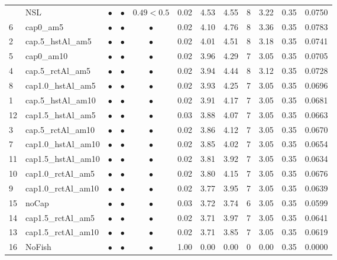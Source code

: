 \documentclass[11pt]{book}
\begin{document}
\begin{landscape}
\begin{longtable}[t]{llcccccccccc}
\midrule
\endhead
\
\endfoot
\bottomrule
\endlastfoot
17 & NSL & $\bullet$ & $\bullet$ & $0.49<0.5$ & 0.02 & 4.53 & 4.55 & 8 & 3.22 & 0.35 & 0.0750\\
6 & cap0\_am5 & $\bullet$ & $\bullet$ & $\bullet$ & 0.02 & 4.10 & 4.76 & 8 & 3.36 & 0.35 & 0.0783\\
2 & cap.5\_hstAl\_am5 & $\bullet$ & $\bullet$ & $\bullet$ & 0.02 & 4.01 & 4.51 & 8 & 3.18 & 0.35 & 0.0741\\
5 & cap0\_am10 & $\bullet$ & $\bullet$ & $\bullet$ & 0.02 & 3.96 & 4.29 & 7 & 3.05 & 0.35 & 0.0705\\
4 & cap.5\_rctAl\_am5 & $\bullet$ & $\bullet$ & $\bullet$ & 0.02 & 3.94 & 4.44 & 8 & 3.12 & 0.35 & 0.0728\\
8 & cap1.0\_hstAl\_am5 & $\bullet$ & $\bullet$ & $\bullet$ & 0.02 & 3.93 & 4.25 & 7 & 3.05 & 0.35 & 0.0696\\
1 & cap.5\_hstAl\_am10 & $\bullet$ & $\bullet$ & $\bullet$ & 0.02 & 3.91 & 4.17 & 7 & 3.05 & 0.35 & 0.0681\\
12 & cap1.5\_hstAl\_am5 & $\bullet$ & $\bullet$ & $\bullet$ & 0.03 & 3.88 & 4.07 & 7 & 3.05 & 0.35 & 0.0663\\
3 & cap.5\_rctAl\_am10 & $\bullet$ & $\bullet$ & $\bullet$ & 0.02 & 3.86 & 4.12 & 7 & 3.05 & 0.35 & 0.0670\\
7 & cap1.0\_hstAl\_am10 & $\bullet$ & $\bullet$ & $\bullet$ & 0.02 & 3.85 & 4.02 & 7 & 3.05 & 0.35 & 0.0654\\
11 & cap1.5\_hstAl\_am10 & $\bullet$ & $\bullet$ & $\bullet$ & 0.02 & 3.81 & 3.92 & 7 & 3.05 & 0.35 & 0.0634\\
10 & cap1.0\_rctAl\_am5 & $\bullet$ & $\bullet$ & $\bullet$ & 0.02 & 3.80 & 4.15 & 7 & 3.05 & 0.35 & 0.0676\\
9 & cap1.0\_rctAl\_am10 & $\bullet$ & $\bullet$ & $\bullet$ & 0.02 & 3.77 & 3.95 & 7 & 3.05 & 0.35 & 0.0639\\
15 & noCap & $\bullet$ & $\bullet$ & $\bullet$ & 0.03 & 3.72 & 3.74 & 6 & 3.05 & 0.35 & 0.0599\\
14 & cap1.5\_rctAl\_am5 & $\bullet$ & $\bullet$ & $\bullet$ & 0.02 & 3.71 & 3.97 & 7 & 3.05 & 0.35 & 0.0641\\
13 & cap1.5\_rctAl\_am10 & $\bullet$ & $\bullet$ & $\bullet$ & 0.02 & 3.71 & 3.85 & 7 & 3.05 & 0.35 & 0.0619\\
16 & NoFish & $\bullet$ & $\bullet$ & $\bullet$ & 1.00 & 0.00 & 0.00 & 0 & 0.00 & 0.35 & 0.0000\\*
\end{longtable}
\end{landscape}
\endgroup{}
\end{document}
